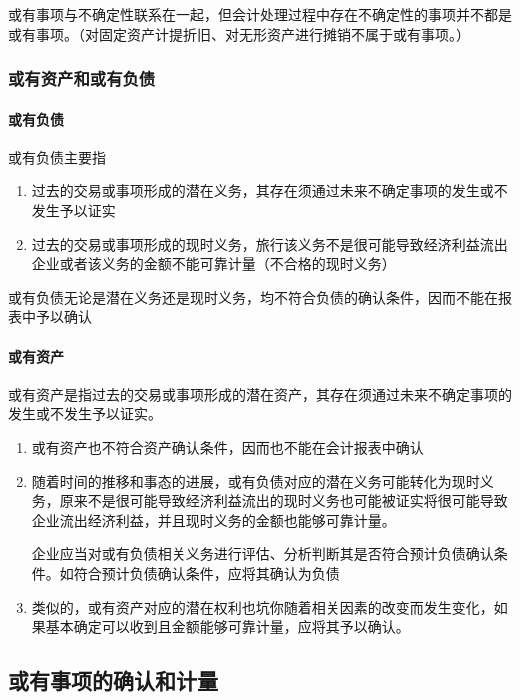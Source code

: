 \documentclass[UTF8,12pt]{ctexart}
\numberwithin{equation}{section} %
\numberwithin{figure}{section}
\numberwithin{table}{section}
\begin{document}
	或有事项与不确定性联系在一起，但会计处理过程中存在不确定性的事项并不都是或有事项。（对固定资产计提折旧、对无形资产进行摊销不属于或有事项。）
	
	\subsubsection{或有资产和或有负债}
	\paragraph{或有负债}
	或有负债主要指
	\begin{enumerate}
		\item 过去的交易或事项形成的潜在义务，其存在须通过未来不确定事项的发生或不发生予以证实
		
		\item 过去的交易或事项形成的现时义务，旅行该义务不是很可能导致经济利益流出企业或者该义务的金额不能可靠计量（不合格的现时义务）
	\end{enumerate}

	或有负债无论是潜在义务还是现时义务，均不符合负债的确认条件，因而不能在报表中予以确认
	
	\paragraph{或有资产}
	或有资产是指过去的交易或事项形成的潜在资产，其存在须通过未来不确定事项的发生或不发生予以证实。
	
	\begin{enumerate}
		\item 或有资产也不符合资产确认条件，因而也不能在会计报表中确认
		
		\item 随着时间的推移和事态的进展，或有负债对应的潜在义务可能转化为现时义务，原来不是很可能导致经济利益流出的现时义务也可能被证实将很可能导致企业流出经济利益，并且现时义务的金额也能够可靠计量。
		
		企业应当对或有负债相关义务进行评估、分析判断其是否符合预计负债确认条件。如符合预计负债确认条件，应将其确认为负债
		
		\item 类似的，或有资产对应的潜在权利也坑你随着相关因素的改变而发生变化，如果基本确定可以收到且金额能够可靠计量，应将其予以确认。
	\end{enumerate}
	
	\subsection{或有事项的确认和计量}
\end{document}
